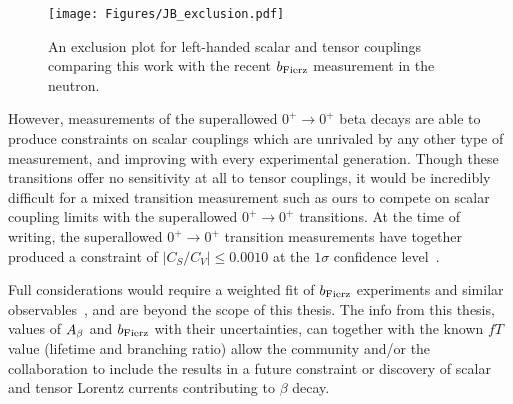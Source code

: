 \note{}
\begin{figure}[h!t!b!]
	\centering
	\texttt{[image: Figures/JB\_exclusion.pdf]}
	\caption[An exclusion plot for left-handed scalar and tensor couplings comparing this work with the recent $\bFierz$ measurement in the neutron]{An exclusion plot for left-handed scalar and tensor couplings comparing this work with the recent $\bFierz$ measurement in the neutron\cite{Saul2020}.}
	\label{fig:exclusionplotfromjohn}
\end{figure}

However, measurements of the superallowed $0^+ \rightarrow 0^+$ beta decays are able to produce constraints on scalar couplings which are unrivaled by any other type of measurement, and improving with every experimental generation.  Though these transitions offer no sensitivity at all to tensor couplings, it would be incredibly difficult for a mixed transition measurement such as ours to compete on scalar coupling limits with the superallowed $0^+ \rightarrow 0^+$ transitions.  At the time of writing, the superallowed $0^+ \rightarrow 0^+$ transition measurements have together produced a constraint of \mbox{$\left| C_S / C_V \right| \leq 0.0010$} at the $1\sigma$ confidence level~\cite{HardyTownerSuperallowed2020}.
\note{}

%
%



Full considerations would require a weighted fit of $\bFierz$ experiments and similar observables~\cite{Falkowski2021}, and are beyond the scope of this thesis.
The info from this thesis, values of $A_{\beta}$ and $\bFierz$ with their uncertainties, can together with the known $fT$ value (lifetime and
branching ratio) allow the community and/or the collaboration to include the results in a future constraint or discovery of scalar and tensor Lorentz currents
contributing to $\beta$ decay.


